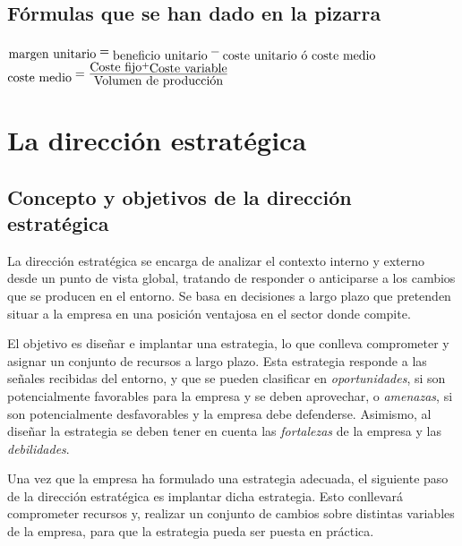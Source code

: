 \documentclass[10pt,a4paper,spanish]{report}
\begin{document}
            \section{\textcolor[rgb]{0.3,0.4,0.6}Fórmulas que se han dado en la pizarra}
                  \begin{center}
                        $\txt{margen unitario} = \txt{beneficio unitario} - \txt{coste unitario ó coste medio}$
                        \\
                        $\txt{coste medio} = \frac{\txt{Coste fijo} + \txt{Coste variable}}{\txt{Volumen de producción}}$
                  \end{center}

\chapter{\textcolor[rgb]{0.4,0.9,0.6}{La dirección estratégica}}
      \section{\textcolor[rgb]{0.4,0.9,0.6}Concepto y objetivos de la dirección estratégica}

            La dirección estratégica se encarga de analizar el contexto interno y externo desde un punto de vista global, tratando de responder o anticiparse a los cambios que se producen en el entorno. Se basa en decisiones a largo plazo que pretenden situar a la empresa en una posición ventajosa en el sector donde compite.

            El objetivo es diseñar e implantar una estrategia, lo que conlleva comprometer y asignar un conjunto de recursos a largo plazo. Esta estrategia responde a las señales recibidas del entorno, y que se pueden clasificar en \textit{\textcolor[rgb]{0.4,0.9,0.6}{oportunidades}}, si son potencialmente favorables para la empresa y se deben aprovechar, o \textit{\textcolor[rgb]{0.4,0.9,0.6}{amenazas}}, si son potencialmente desfavorables y la empresa debe defenderse. Asimismo, al diseñar la estrategia se deben tener en cuenta las \textit{\textcolor[rgb]{0.4,0.9,0.6}{fortalezas}} de la empresa y las \textit{\textcolor[rgb]{0.4,0.9,0.6}{debilidades}}.

            Una vez que la empresa ha formulado una estrategia adecuada, el siguiente paso de la dirección estratégica es implantar dicha estrategia. Esto conllevará comprometer recursos y, realizar un conjunto de cambios sobre distintas variables de la empresa, para que la estrategia pueda ser puesta en práctica.
\end{document}
